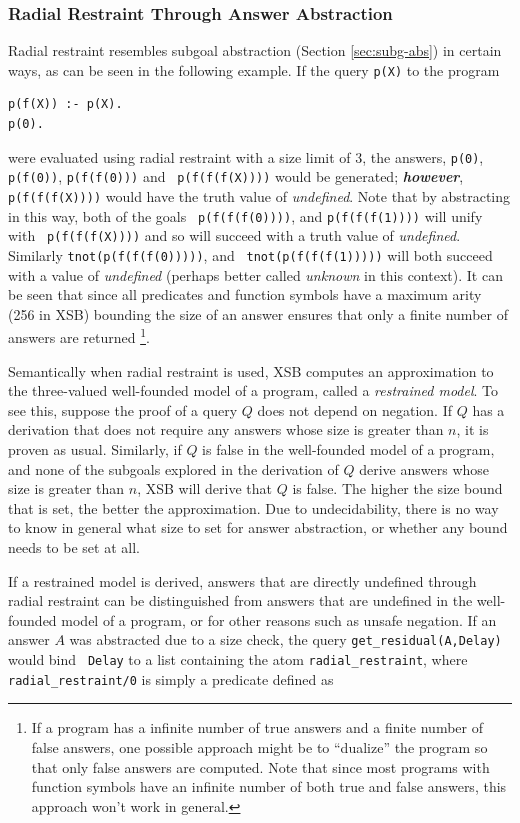 \subsubsection{Radial Restraint Through Answer Abstraction}
Radial restraint resembles subgoal abstraction (Section
\ref{sec:subg-abs}) in certain ways, as can be seen in the following
example. If the query {\tt p(X)} to the program
%
\begin{verbatim}
p(f(X)) :- p(X).  
p(0).
\end{verbatim}
%
were evaluated using radial restraint with a size limit of 3, the
answers, {\tt p(0)}, {\tt p(f(0))}, {\tt p(f(f(0)))} and {\tt
  p(f(f(f(X))))} would be generated; {\bf {\em however}}, {\tt
  p(f(f(f(X))))} would have the truth value of {\em undefined}.  Note
that by abstracting in this way, both of the goals {\tt
  p(f(f(f(0))))}, and {\tt p(f(f(f(1))))} will unify with {\tt
  p(f(f(f(X))))} and so will succeed with a truth value of {\em
  undefined}.  Similarly {\tt tnot(p(f(f(f(0)))))}, and {\tt
  tnot(p(f(f(f(1)))))} will both succeed with a value of {\em
  undefined} (perhaps better called {\em unknown} in this context).
%
It can be seen that since all predicates and function symbols have a
maximum arity (256 in XSB) bounding the size of an answer ensures that
only a finite number of answers are returned
\footnote{If a program has a infinite number of true answers and a
  finite number of false answers, one possible approach might be to
  ``dualize'' the program so that only false answers are computed.
  Note that since most programs with function symbols have an infinite
  number of both true and false answers, this approach won't work in
  general.}.

Semantically when radial restraint is used, XSB computes an
approximation to the three-valued well-founded model of a program,
called a {\em restrained model}.  To see this, suppose the proof of a
query $Q$ does not depend on negation.  If $Q$ has a derivation that
does not require any answers whose size is greater than $n$, it is
proven as usual.  Similarly, if $Q$ is false in the well-founded model
of a program, and none of the subgoals explored in the derivation of
$Q$ derive answers whose size is greater than $n$, XSB will derive
that $Q$ is false.  The higher the size bound that is set, the better
the approximation.  Due to undecidability, there is no way to know in
general what size to set for answer abstraction, or whether any bound
needs to be set at all.

If a restrained model is derived, answers that are directly undefined
through radial restraint can be distinguished from answers that are
undefined in the well-founded model of a program, or for other reasons
such as unsafe negation.  If an answer $A$ was abstracted due to a
size check, the query {\tt get\_residual(A,Delay)} would bind {\tt
  Delay} to a list containing the atom {\tt radial\_restraint}, where
{\tt radial\_restraint/0} is simply a predicate defined as

